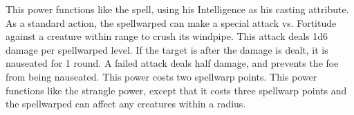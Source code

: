  This power functions like the  spell, using his Intelligence as his casting attribute.
 As a standard action, the spellwarped can make a special attack vs. Fortitude against a creature within \rngclose range to crush its windpipe. This attack deals 1d6 damage per spellwarped level. If the target is \bloodied after the damage is dealt, it is nauseated for 1 round. A failed attack deals half damage, and prevents the foe from being nauseated. This power costs two spellwarp points.
 This power functions like the strangle power, except that it costs three spellwarp points and the spellwarped can affect any creatures within a \areasmall radius.

